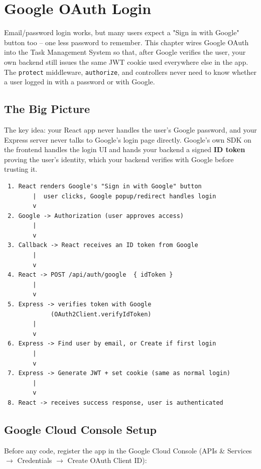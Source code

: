 \chapter{Google OAuth Login}

Email/password login works, but many users expect a "Sign in with Google" button too -- one less password to remember. This chapter wires Google OAuth into the Task Management System so that, after Google verifies the user, your own backend still issues the same JWT cookie used everywhere else in the app. The \texttt{protect} middleware, \texttt{authorize}, and controllers never need to know whether a user logged in with a password or with Google.

\section{The Big Picture}

The key idea: your React app never handles the user's Google password, and your Express server never talks to Google's login page directly. Google's own SDK on the frontend handles the login UI and hands your backend a signed \textbf{ID token} proving the user's identity, which your backend verifies with Google before trusting it.

\begin{diagrambox}
\begin{verbatim}
 1. React renders Google's "Sign in with Google" button
        |  user clicks, Google popup/redirect handles login
        v
 2. Google -> Authorization (user approves access)
        |
        v
 3. Callback -> React receives an ID token from Google
        |
        v
 4. React -> POST /api/auth/google  { idToken }
        |
        v
 5. Express -> verifies token with Google
             (OAuth2Client.verifyIdToken)
        |
        v
 6. Express -> Find user by email, or Create if first login
        |
        v
 7. Express -> Generate JWT + set cookie (same as normal login)
        |
        v
 8. React -> receives success response, user is authenticated
\end{verbatim}
\end{diagrambox}

\section{Google Cloud Console Setup}

Before any code, register the app in the Google Cloud Console (APIs \& Services $\rightarrow$ Credentials $\rightarrow$ Create OAuth Client ID):

